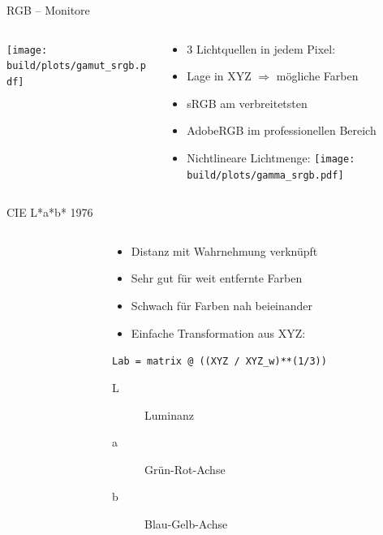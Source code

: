 \documentclass[aspectratio=1610, 9pt]{beamer}
\begin{document}
\begin{frame}{RGB – Monitore}
  \begin{columns}[onlytextwidth]%
    \begin{column}{0.495\textwidth}%
      \texttt{[image: build/plots/gamut\_srgb.pdf]}%
    \end{column}%
    \begin{column}{0.495\textwidth}%
      \begin{itemize}
        \item 3 Lichtquellen in jedem Pixel:
        \item Lage in XYZ ${}⇒{}$ mögliche Farben
        \item sRGB am verbreitetsten
        \item AdobeRGB im professionellen Bereich
        \item Nichtlineare Lichtmenge:
          \texttt{[image: build/plots/gamma\_srgb.pdf]}
      \end{itemize}
    \end{column}
  \end{columns}%
\end{frame}

\begin{frame}{CIE L*a*b* 1976}
  \begin{columns}[onlytextwidth]%
    \begin{column}{0.55\textwidth}%
    \end{column}%
    \begin{column}{0.44\textwidth}%
      \begin{itemize}
        \item Distanz mit Wahrnehmung verknüpft
        \item Sehr gut für weit entfernte Farben
        \item Schwach für Farben nah beieinander
        \item Einfache Transformation aus XYZ:
      \end{itemize}
      \texttt{\small Lab = matrix @ ((XYZ / XYZ\_w)**(1/3))}

      \begin{description}
        \item[L] Luminanz
        \item[a] Grün-Rot-Achse
        \item[b] Blau-Gelb-Achse
      \end{description}
    \end{column}%
  \end{columns}%
\end{frame}
\end{document}
